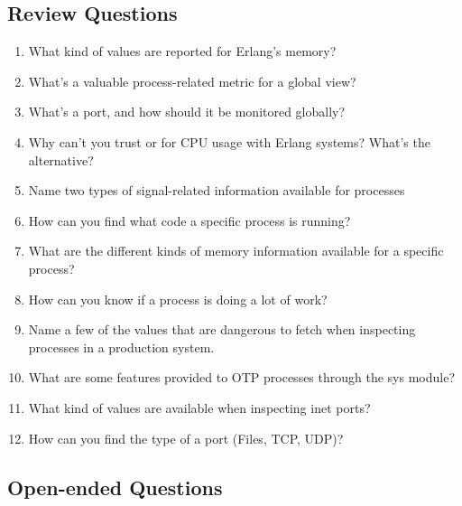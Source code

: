 \documentclass[11pt, oneside]{book}   	%
\begin{document}
\subsection*{Review Questions}

\begin{enumerate}
	\item What kind of values are reported for Erlang's memory?
	\item What's a valuable process-related metric for a global view?
	\item What's a port, and how should it be monitored globally?
	\item Why can't you trust  or  for CPU usage with Erlang systems? What's the alternative?
	\item Name two types of signal-related information available for processes
	\item How can you find what code a specific process is running?
	\item What are the different kinds of memory information available for a specific process?
	\item How can you know if a process is doing a lot of work?
	\item Name a few of the values that are dangerous to fetch when inspecting processes in a production system.
	\item What are some features provided to OTP processes through the sys module?
	\item What kind of values are available when inspecting inet ports?
	\item How can you find the type of a port (Files, TCP, UDP)?
\end{enumerate}

\subsection*{Open-ended Questions}
\end{document}
